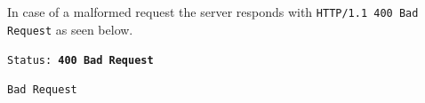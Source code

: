 \begin{itemize}
\begin{description}[labelwidth=4em, leftmargin=\dimexpr\labelwidth+\labelsep\relax]
In case of a malformed request the server responds with \texttt{HTTP/1.1 400 Bad Request} as seen below.\\

\begin{minipage}{\linewidth}
{
\texttt{Status: {\color{BrickRed}\textbf{400 Bad Request}}}
\begin{verbatim}
Bad Request
\end{verbatim}
\label{sc:histogram-numerical-response-2}
}
\end{minipage}

 \end{description}
\end{itemize}




